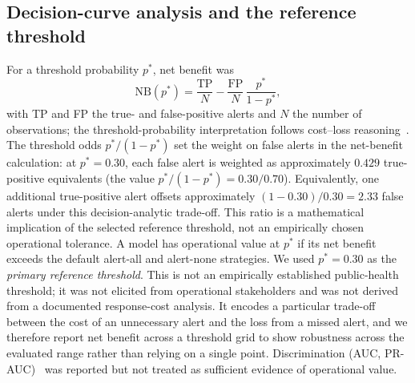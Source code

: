 \documentclass[11pt,a4paper]{article}
\begin{document}
\subsection{Decision-curve analysis and the reference threshold}
For a threshold probability $p^*$, net benefit was
\[
\mathrm{NB}(p^*)=\frac{\mathrm{TP}}{N}-\frac{\mathrm{FP}}{N}\,\frac{p^*}{1-p^*},
\]
with TP and FP the true- and false-positive alerts and $N$ the number of observations; the threshold-probability interpretation follows cost--loss reasoning~\cite{Vickers2006,Murphy1985,Tozan2023}. The threshold odds $p^*/(1-p^*)$ set the weight on false alerts in the net-benefit calculation: at $p^*=0.30$, each false alert is weighted as approximately $0.429$ true-positive equivalents (the value $p^*/(1-p^*)=0.30/0.70$). Equivalently, one additional true-positive alert offsets approximately $(1-0.30)/0.30=2.33$ false alerts under this decision-analytic trade-off. This ratio is a mathematical implication of the selected reference threshold, not an empirically chosen operational tolerance. A model has operational value at $p^*$ if its net benefit exceeds the default alert-all and alert-none strategies. We used $p^*=0.30$ as the \emph{primary reference threshold}. This is not an empirically established public-health threshold; it was not elicited from operational stakeholders and was not derived from a documented response-cost analysis. It encodes a particular trade-off between the cost of an unnecessary alert and the loss from a missed alert, and we therefore report net benefit across a threshold grid to show robustness across the evaluated range rather than relying on a single point. Discrimination (AUC, PR-AUC)~\cite{SaitoRehmsmeier2015} was reported but not treated as sufficient evidence of operational value.
\end{document}
